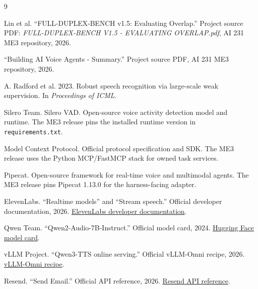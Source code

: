 \documentclass[sigconf,nonacm,balance=false]{acmart}
\begin{document}
\begingroup
\scriptsize
\begin{thebibliography}{9}

Lin et al. ``FULL-DUPLEX-BENCH v1.5: Evaluating Overlap.''
Project source PDF: \textit{FULL-DUPLEX-BENCH V1.5 - EVALUATING OVERLAP.pdf},
AI 231 ME3 repository, 2026.

``Building AI Voice Agents - Summary.'' Project source PDF, AI 231 ME3
repository, 2026.

A. Radford et al. 2023. Robust speech recognition via large-scale weak
supervision. In \textit{Proceedings of ICML}.

Silero Team. Silero VAD. Open-source voice activity detection model and
runtime. The ME3 release pins the installed runtime version in
\texttt{requirements.txt}.

Model Context Protocol. Official protocol specification and SDK. The ME3
release uses the Python MCP/FastMCP stack for owned task services.

Pipecat. Open-source framework for real-time voice and multimodal agents. The
ME3 release pins Pipecat 1.13.0 for the harness-facing adapter.

ElevenLabs. ``Realtime models'' and ``Stream speech.'' Official developer
documentation, 2026. \href{https://elevenlabs.io/docs/eleven-agents/customization/realtime-models}{ElevenLabs developer documentation}.

Qwen Team. ``Qwen2-Audio-7B-Instruct.'' Official model card, 2024.
\href{https://huggingface.co/Qwen/Qwen2-Audio-7B-Instruct}{Hugging Face model card}.

vLLM Project. ``Qwen3-TTS online serving.'' Official vLLM-Omni recipe, 2026.
\href{https://github.com/vllm/vllm-omni/blob/main/recipes/Qwen/Qwen3-TTS.md}{vLLM-Omni recipe}.

Resend. ``Send Email.'' Official API reference, 2026.
\href{https://resend.com/docs/api-reference/emails/send-email}{Resend API reference}.

\end{thebibliography}
\endgroup
\end{document}
